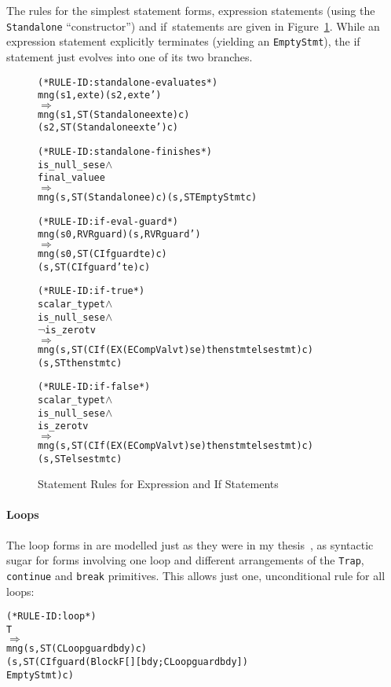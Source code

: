 \documentclass[11pt]{article}
\begin{document}
The rules for the simplest statement forms, expression statements
(using the \texttt{Standalone}
``constructor'') and
if~statements are given in Figure~\ref{fig:simple-stmts}.  While an
expression statement explicitly terminates (yielding an
\texttt{EmptyStmt}), the if statement just evolves into one of its two
branches.
\begin{figure}[htbp]
%
%
%
%
%
\begin{alltt}
(* RULE-ID: standalone-evaluates *)
     mng (s1, exte) (s2, exte')
   \(\Rightarrow\)
     mng (s1, ST (Standalone exte) c)
         (s2, ST (Standalone exte') c)


(* RULE-ID: standalone-finishes *)
     is_null_se se \(\land\)
     final_value e
   \(\Rightarrow\)
     mng (s, ST (Standalone e) c) (s, ST EmptyStmt c)


(* RULE-ID: if-eval-guard *)
     mng (s0, RVR guard) (s, RVR guard')
   \(\Rightarrow\)
     mng (s0, ST (CIf guard t e) c)
         (s, ST (CIf guard' t e) c)


(* RULE-ID: if-true *)
     scalar_type t \(\land\)
     is_null_se se \(\land\)
     \(\neg\)is_zero t v
   \(\Rightarrow\)
     mng (s, ST (CIf (EX (ECompVal v t) se) thenstmt elsestmt) c)
         (s, ST thenstmt c)


(* RULE-ID: if-false *)
     scalar_type t \(\land\)
     is_null_se se \(\land\)
     is_zero t v
   \(\Rightarrow\)
     mng (s, ST (CIf (EX (ECompVal v t) se) thenstmt elsestmt) c)
         (s, ST elsestmt c)
\end{alltt}
\caption{Statement Rules for Expression and If Statements}
\label{fig:simple-stmts}
\end{figure}

%
%
\paragraph{Loops} The loop forms in \cpp{} are modelled just as they
were in my thesis~\cite[\S3.4.5]{Norrish98}, as syntactic sugar for
forms involving one loop and different arrangements of the
\texttt{Trap}, \texttt{continue} and \texttt{break} primitives.
This allows just one, unconditional rule for all loops:
\begin{center}
  \begin{minipage}{\textwidth}
\begin{alltt}
(* RULE-ID: loop *)
     T
   \(\Rightarrow\)
     mng (s, ST (CLoop guard bdy) c)
         (s, ST (CIf guard (Block F [] [bdy; CLoop guard bdy])
                           EmptyStmt) c)
\end{alltt}
  \end{minipage}
\end{center}
\end{document}
